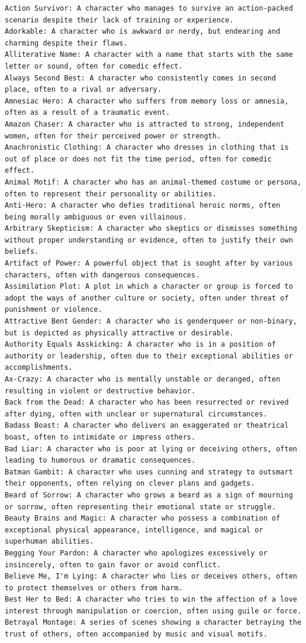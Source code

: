\documentclass[11pt]{article}
\begin{document}
\begin{lstlisting}
Action Survivor: A character who manages to survive an action-packed scenario despite their lack of training or experience.
Adorkable: A character who is awkward or nerdy, but endearing and charming despite their flaws.
Alliterative Name: A character with a name that starts with the same letter or sound, often for comedic effect.
Always Second Best: A character who consistently comes in second place, often to a rival or adversary.
Amnesiac Hero: A character who suffers from memory loss or amnesia, often as a result of a traumatic event.
Amazon Chaser: A character who is attracted to strong, independent women, often for their perceived power or strength.
Anachronistic Clothing: A character who dresses in clothing that is out of place or does not fit the time period, often for comedic effect.
Animal Motif: A character who has an animal-themed costume or persona, often to represent their personality or abilities.
Anti-Hero: A character who defies traditional heroic norms, often being morally ambiguous or even villainous.
Arbitrary Skepticism: A character who skeptics or dismisses something without proper understanding or evidence, often to justify their own beliefs.
Artifact of Power: A powerful object that is sought after by various characters, often with dangerous consequences.
Assimilation Plot: A plot in which a character or group is forced to adopt the ways of another culture or society, often under threat of punishment or violence.
Attractive Bent Gender: A character who is genderqueer or non-binary, but is depicted as physically attractive or desirable.
Authority Equals Asskicking: A character who is in a position of authority or leadership, often due to their exceptional abilities or accomplishments.
Ax-Crazy: A character who is mentally unstable or deranged, often resulting in violent or destructive behavior.
Back from the Dead: A character who has been resurrected or revived after dying, often with unclear or supernatural circumstances.
Badass Boast: A character who delivers an exaggerated or theatrical boast, often to intimidate or impress others.
Bad Liar: A character who is poor at lying or deceiving others, often leading to humorous or dramatic consequences.
Batman Gambit: A character who uses cunning and strategy to outsmart their opponents, often relying on clever plans and gadgets.
Beard of Sorrow: A character who grows a beard as a sign of mourning or sorrow, often representing their emotional state or struggle.
Beauty Brains and Magic: A character who possess a combination of exceptional physical appearance, intelligence, and magical or superhuman abilities.
Begging Your Pardon: A character who apologizes excessively or insincerely, often to gain favor or avoid conflict.
Believe Me, I'm Lying: A character who lies or deceives others, often to protect themselves or others from harm.
Best Her to Bed: A character who tries to win the affection of a love interest through manipulation or coercion, often using guile or force.
Betrayal Montage: A series of scenes showing a character betraying the trust of others, often accompanied by music and visual motifs.


\end{lstlisting}
\end{document}
